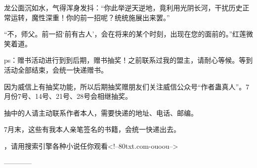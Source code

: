 \begin{this_body}
龙公面沉如水，气得浑身发抖：“你此举逆天逆地，竟利用光阴长河，干扰历史正常运转，魔性深重！你的前一招呢？统统施展出来罢。”

“不，师父。前一招‘前有古人’，会在将来的某个时刻，出现在您的面前的。”红莲微笑着道。

ps：赠书活动进行到到后期，赠书抽奖！之前联系过我的盟主，请耐心等候。等到活动全部结束，会统一快递赠书。

因为威信上有抽奖功能，所以后期抽奖赠朋友们关注威信公众号“作者蛊真人”。7月份7号、14号、21号、28号会相继抽奖。

抽中的人请主动联系作者本人，需要快递的地址、电话、邮编。

7月末，这些有我本人亲笔签名的书籍，会统一快递出去。

，请用搜索引擎各种小说任你观看<!--80txt.com-ouoou-->

------------

\end{this_body}

